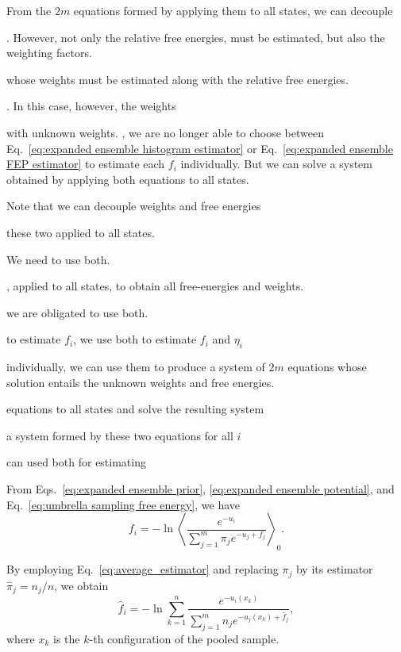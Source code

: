 \documentclass[aip,jcp,reprint,amsmath,amssymb]{revtex4-1}
\begin{document}
From the $2m$ equations formed by applying them to all states, we can decouple 


. However, not only the relative free energies,  must be estimated, but also the weighting factors.


 whose weights must be estimated along with the relative free energies.


. In this case, however, the weights 


 with unknown weights. , we are no longer able to choose between Eq.~\eqref{eq:expanded ensemble histogram estimator} or Eq.~\eqref{eq:expanded ensemble FEP estimator} to estimate each $f_i$ individually. But we can solve a system obtained by applying both equations to all states.


 Note that we can decouple weights and free energies


these two applied to all states. 


We need to use both.


, applied to all states, to obtain all free-energies and weights.


we are obligated to use both.


 to estimate $f_i$, we use both to estimate $f_i$ and $\eta_i$


 individually, we can use them to produce a system of $2m$ equations whose solution entails the unknown weights and free energies.


equations to all states and solve the resulting system


a system formed by these two equations for all $i$ 


 can used both for estimating 



From Eqs.~\eqref{eq:expanded ensemble prior}, \eqref{eq:expanded ensemble potential}, and Eq.~\eqref{eq:umbrella sampling free energy}, we have
\begin{equation}
\label{eq:mbar exact relation}
f_i = -\ln \left\langle \frac{e^{-u_i}}{\sum_{j=1}^m \pi_j e^{-u_j + f_j}} \right\rangle_0.
\end{equation}

By employing Eq.~\eqref{eq:average_estimator} and replacing $\pi_j$ by its estimator $\hat \pi_j = n_j/n$, we obtain
\begin{equation}
\label{eq:mbar estimator}
\hat f_i = -\ln \sum_{k=1}^n \frac{e^{-u_i(x_k)}}{\sum_{j=1}^m n_j e^{-u_j(x_k) + \hat f_j}},
\end{equation}
where $x_k$ is the $k$-th configuration of the pooled sample.
\end{document}
